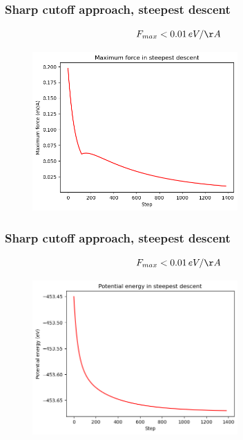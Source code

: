 \documentclass{beamer}
\begin{document}
\begin{frame}
    \frametitle{Sharp cutoff approach, steepest descent}

    $$F_{max}<0.01\,eV/\AA$$

    \begin{figure}
        \includegraphics[width=0.7\textwidth]{images/force.png}
    \end{figure}

\end{frame}

\begin{frame}
    \frametitle{Sharp cutoff approach, steepest descent}

    $$F_{max}<0.01\,eV/\AA$$

    \begin{figure}
        \includegraphics[width=0.7\textwidth]{images/Usteepest.png}
    \end{figure}

\end{frame}
\end{document}
